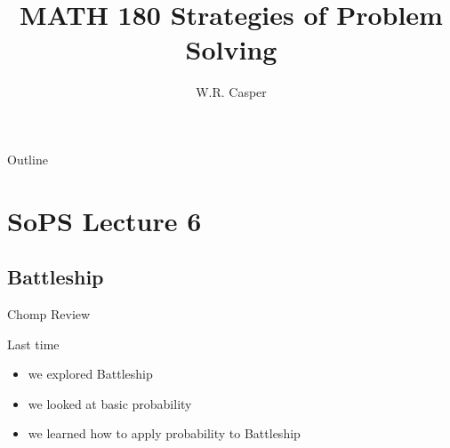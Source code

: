 \documentclass{beamer}
\title{MATH 180 Strategies of Problem Solving}
\subtitle
{} %
\author[W.R. Casper] %
{W.R. Casper}
\institute[California State University Fullerton] %
{
  Department of Mathematics\\
  California State University Fullerton}
\begin{document}
\begin{frame}
  \titlepage
\end{frame}

\begin{frame}{Outline}
  \tableofcontents
\end{frame}



\section{SoPS Lecture 6}
\subsection{Battleship}


\begin{frame}{Chomp Review}
  \begin{block}{Last time}
    \begin{itemize}
\pause
      \item we explored Battleship
\pause
      \item we looked at basic probability
\pause
      \item we learned how to apply probability to Battleship
    \end{itemize}
  \end{block}
\end{frame}
\end{document}
